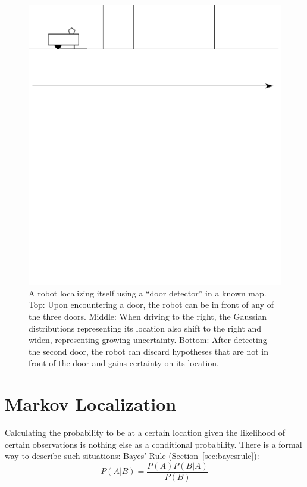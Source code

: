 \begin{figure}
	\centering
		\includegraphics[width=\textwidth]{figs/three_door_example}
	\caption{A robot localizing itself using a ``door detector'' in a known map. Top: Upon encountering a door, the robot can be in front of any of the three doors. Middle: When driving to the right, the Gaussian distributions representing its location also shift to the right and widen, representing growing uncertainty. Bottom: After detecting the second door, the robot can discard hypotheses that are not in front of the door and gains certainty on its location. }
	\label{fig:three_door_example}
\end{figure}

\section{Markov Localization}\label{sec:markovloc}
Calculating the probability to be at a certain location given the likelihood of certain observations is nothing else as a conditional probability. There is a formal way to describe such situations: Bayes' Rule (Section~\ref{sec:bayesrule}):
\begin{equation}
P(A|B)=\frac{P(A)P(B|A)}{P(B)}
\end{equation}
